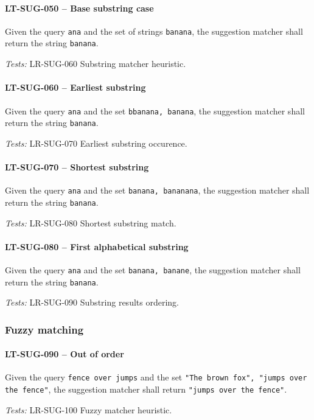 \paragraph{LT-SUG-050 -- Base substring case}
Given the query \lstinline{ana} and the set of strings
\lstinline{banana}, the suggestion matcher shall return the
string \lstinline{banana}.

\textit{Tests: } LR-SUG-060 Substring matcher heuristic.

\paragraph{LT-SUG-060 -- Earliest substring}
Given the query \lstinline{ana} and the set \lstinline{bbanana, banana},
the suggestion matcher shall return the string \lstinline{banana}.

\textit{Tests: } LR-SUG-070 Earliest substring occurence.

\paragraph{LT-SUG-070 -- Shortest substring}
Given the query \lstinline{ana} and the set \lstinline{banana, bananana},
the suggestion matcher shall return the string \lstinline{banana}.

\textit{Tests: } LR-SUG-080 Shortest substring match.

\paragraph{LT-SUG-080 -- First alphabetical substring}
Given the query \lstinline{ana} and the set \lstinline{banana, banane},
the suggestion matcher shall return the string \lstinline{banana}.

\textit{Tests: } LR-SUG-090 Substring results ordering.

\subsubsection{Fuzzy matching}
\paragraph{LT-SUG-090 -- Out of order}
Given the query \lstinline{fence over jumps} and the set
\lstinline{"The brown fox", "jumps over the fence"}, the suggestion
matcher shall return \lstinline{"jumps over the fence"}.

\textit{Tests: } LR-SUG-100 Fuzzy matcher heuristic.

